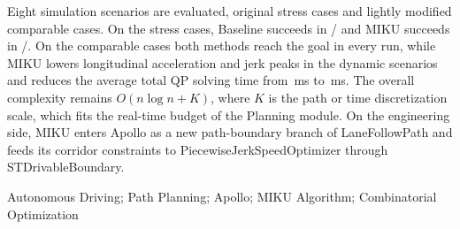 {Eight simulation scenarios are evaluated, \MPressureScenarioTotal{} original stress cases and \MComparableScenarioTotal{} lightly modified comparable cases. On the stress cases, Baseline succeeds in \MPressureBaselinePassCount{}/\MPressureScenarioTotal{} and MIKU succeeds in \MPressureMikuPassCount{}/\MPressureScenarioTotal{}. On the comparable cases both methods reach the goal in every run, while MIKU lowers longitudinal acceleration and jerk peaks in the dynamic scenarios and reduces the average total QP solving time from \MComparableBaselineQpTotal\,ms to \MComparableMikuQpTotal\,ms. The overall complexity remains $O(n\log n+K)$, where $K$ is the path or time discretization scale, which fits the real-time budget of the Planning module. On the engineering side, MIKU enters Apollo as a new path-boundary branch of LaneFollowPath and feeds its corridor constraints to PiecewiseJerkSpeedOptimizer through STDrivableBoundary.

\vspace{0.5em}
\noindent\hspace{2em}{\bfseries Key words: }Autonomous Driving; Path Planning; Apollo; MIKU Algorithm; Combinatorial Optimization

}

